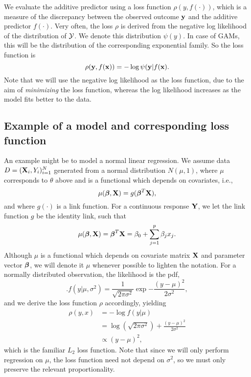 We evaluate the additive predictor using a loss function $\rho(y,f(\cdot))$, which is a measure of the discrepancy between the observed outcome $\mathbf{y}$ and the additive predictor $f(\cdot)$. Very often, the loss $\rho$ is derived from the negative log likelihood of the distribution of $\mathcal{Y}$. We denote this distribution $\psi(y)$. In case of GAMs, this will be the distribution of the corresponding exponential family. So the loss function is
\begin{equation}
    \rho(\mathbf{y},f(\mathbf{x}))=-\log{\psi(\mathbf{y}|f(\mathbf{x})}.
\end{equation}
Note that we will use the negative log likelihood as the loss function, due to the aim of \textit{minimizing} the loss function, whereas the log likelihood increases as the model fits better to the data.

\subsection{Example of a model and corresponding loss function}
An example might be to model a normal linear regression. We assume data $D=(\mathbf{X}_i,Y_i)_{i=1}^N$ generated from a normal distribution $N(\mu,1)$, where $\mu$ corresponds to $\theta$ above and is a functional which depends on covariates, i.e.,
\begin{equation}
    \mu(\boldsymbol{\beta},\mathbf{X})=g(\boldsymbol{\beta}^T\mathbf{X}),
\end{equation}
and where $g(\cdot)$ is a link function. For a continuous response $\mathbf{Y}$, we let the link function $g$ be the identity link, such that
\begin{equation}
    \mu(\boldsymbol{\beta},\mathbf{X})=\boldsymbol{\beta}^T\mathbf{X}=\beta_0+\sum_{j=1}^p\beta_jx_j.
\end{equation}
Although $\mu$ is a functional which depends on covariate matrix $\mathbf{X}$ and parameter vector $\boldsymbol{\beta}$, we will denote it $\mu$ whenever possible to lighten the notation. For a normally distributed observation, the likelihood is the pdf,
\begin{equation}
    .f(y|\mu,\sigma^2)=\frac{1}{\sqrt{2\pi\sigma^2}}\exp{-\frac{(y-\mu)^2}{2\sigma^2}},
\end{equation}
and we derive the loss function $\rho$ accordingly, yielding
\begin{align*}
    \rho(y,x)&=-\log{f(y|\mu)}\\
    &=\log{(\sqrt{2\pi\sigma^2})}+\frac{(y-\mu)^2}{2\sigma^2} \\
    &\propto(y-\mu)^2,
\end{align*}
which is the familiar $L_2$ loss function. Note that since we will only perform regression on $\mu$, the loss function need not depend on $\sigma^2$, so we must only preserve the relevant proportionality.

